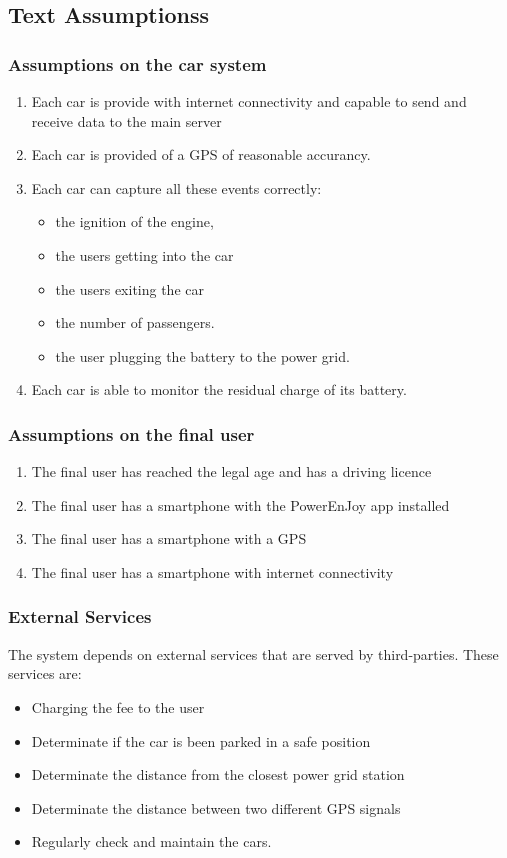 \documentclass[11pt]{article} %
\newcommand{\pe}{PowerEnJoy }
\begin{document}
\subsection{Text Assumptionss}
  
\subsubsection{Assumptions on the car system}
\begin{enumerate}
	\item  Each car is provide with internet connectivity and capable to send and receive data to the main server
	\item  Each car is provided of a GPS of reasonable accurancy.
	\item  Each car can capture all these events correctly:
		\begin{itemize}
			\item the ignition of the engine, 
			\item the users getting into the car
			\item the users exiting the car 
			\item the number of passengers.
			\item the user plugging the battery to the power grid.
		\end{itemize}
	\item Each car is able to monitor the residual charge of its battery.
\end{enumerate}


\subsubsection{Assumptions on the final user}
\begin{enumerate}
	\item The final user has reached the legal age and has a driving licence
	\item The final user has a smartphone with the \pe app installed
	\item The final user has a smartphone with a GPS
	\item The final user has a smartphone with internet connectivity
\end{enumerate}
  
  \subsubsection{External Services}
 The system depends on external services that are served by third-parties. These services are:
  \begin{itemize}
  	\item Charging the fee to the user
  	\item Determinate if the car is been parked in a safe position
  	\item Determinate the distance from the closest power grid station
  	\item Determinate the distance between two different GPS signals
	\item Regularly check and maintain the cars.
  \end{itemize}
  	
\end{document}
